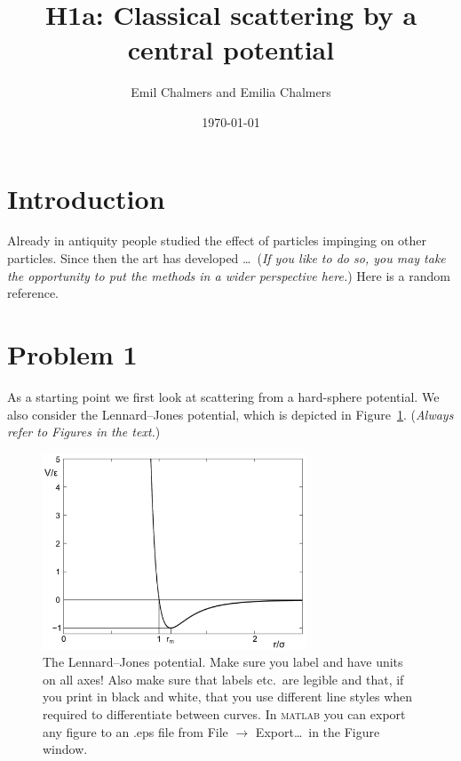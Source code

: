 

\title{H1a: Classical scattering by a central potential}
\author{Emil Chalmers and Emilia Chalmers}
\date{\today}





\section*{Introduction}

Already in antiquity people studied the effect of particles impinging on other
particles. Since then the art has developed \ldots\
(\emph{If you like to do so, you may take the opportunity to put the  methods
in a wider perspective here.}) Here is a random reference.\cite{lamport94}

\section*{Problem 1}
As a starting point we first look at scattering from a hard-sphere
potential. We also consider the Lennard--Jones potential, which is depicted
in Figure~\ref{fig1}. (\emph{Always refer to Figures in the text.})

\begin{figure}[!ht]
\begin{center}
  \includegraphics[width=0.7\textwidth]{template_files/LJ} 
  \caption{The Lennard--Jones potential.
  Make sure you label and have units on all axes! Also make sure that labels etc.\
  are legible and that, if you print in black and white, that you use different line
  styles when required to differentiate between curves. In \textsc{matlab}
  you can export any figure to an .eps file from File $\rightarrow$
  Export\ldots\ in the Figure window.}
  \label{fig1}
\end{center}
\end{figure}
  
